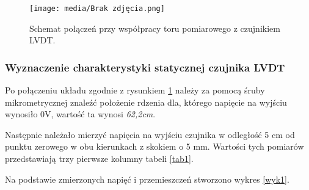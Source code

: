 \documentclass{article}
\begin{document}
\vspace{1em}
\begin{figure}[ht]
    \centering
    \texttt{[image: media/Brak zdjęcia.png]}
    \caption{Schemat połączeń przy współpracy toru pomiarowego z czujnikiem LVDT.}
    \label{fig1}
\end{figure}
\newpage

\subsubsection{Wyznaczenie charakterystyki statycznej czujnika LVDT} \label{1a}
Po połączeniu układu zgodnie z rysunkiem \ref{fig1} należy za pomocą śruby mikrometrycznej znaleźć położenie rdzenia dla, którego napięcie na wyjściu wynosiło 0V, wartość ta wynosi \textit{62,2cm}. 



Następnie należało mierzyć napięcia na wyjściu czujnika w odległość 5 cm od punktu zerowego w obu kierunkach z skokiem o 5 mm. Wartości tych pomiarów przedstawiają trzy pierwsze kolumny tabeli \ref{tab1}.

Na podstawie zmierzonych napięć i przemieszczeń stworzono wykres \ref{wyk1}.
\end{document}
